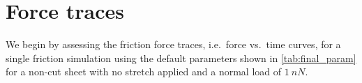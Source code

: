 



\section{Force traces}\label{sec:single_analysis}
We begin by assessing the friction force traces, i.e.\ force vs.\ time curves, for a single friction simulation using the default parameters shown in \cref{tab:final_param} for a non-cut sheet with
no stretch applied and a normal load of $\SI{1}{nN}$. 


